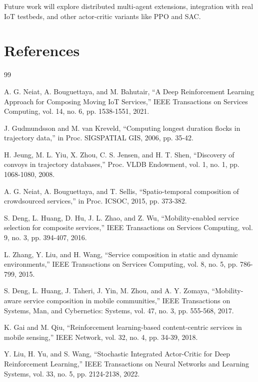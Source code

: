 \documentclass[10pt,twocolumn]{article}
\begin{document}
Future work will explore distributed multi-agent extensions, integration
with real IoT testbeds, and other actor-critic variants like PPO and
SAC.

\section{References}\label{references}

\begin{thebibliography}{99}

	 A. G. Neiat, A. Bouguettaya, and M. Bahutair, ``A Deep Reinforcement Learning Approach for Composing Moving IoT Services,'' IEEE Transactions on Services Computing, vol. 14, no. 6, pp. 1538-1551, 2021.

	 J. Gudmundsson and M. van Kreveld, ``Computing longest duration flocks in trajectory data,'' in Proc. SIGSPATIAL GIS, 2006, pp. 35-42.

	 H. Jeung, M. L. Yiu, X. Zhou, C. S. Jensen, and H. T. Shen, ``Discovery of convoys in trajectory databases,'' Proc. VLDB Endowment, vol. 1, no. 1, pp. 1068-1080, 2008.

	 A. G. Neiat, A. Bouguettaya, and T. Sellis, ``Spatio-temporal composition of crowdsourced services,'' in Proc. ICSOC, 2015, pp. 373-382.

	 S. Deng, L. Huang, D. Hu, J. L. Zhao, and Z. Wu, ``Mobility-enabled service selection for composite services,'' IEEE Transactions on Services Computing, vol. 9, no. 3, pp. 394-407, 2016.

	 L. Zhang, Y. Liu, and H. Wang, ``Service composition in static and dynamic environments,'' IEEE Transactions on Services Computing, vol. 8, no. 5, pp. 786-799, 2015.

	 S. Deng, L. Huang, J. Taheri, J. Yin, M. Zhou, and A. Y. Zomaya, ``Mobility-aware service composition in mobile communities,'' IEEE Transactions on Systems, Man, and Cybernetics: Systems, vol. 47, no. 3, pp. 555-568, 2017.

	 K. Gai and M. Qiu, ``Reinforcement learning-based content-centric services in mobile sensing,'' IEEE Network, vol. 32, no. 4, pp. 34-39, 2018.

	 Y. Liu, H. Yu, and S. Wang, ``Stochastic Integrated Actor-Critic for Deep Reinforcement Learning,'' IEEE Transactions on Neural Networks and Learning Systems, vol. 33, no. 5, pp. 2124-2138, 2022.


\end{thebibliography}
\end{document}
